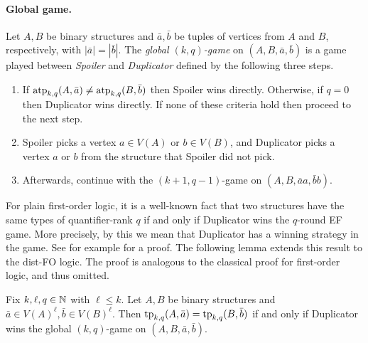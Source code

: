 \paragraph{Global game.}
Let \(A,B\) be binary structures and \(\bar a, \bar b\) be tuples of vertices from \(A\) and \(B\), respectively, with \(|\bar a|=|\bar b|\).
The \emph{global \((k,q)\)-game} on \((A,B,\bar a,\bar b)\) is a game played between \emph{Spoiler} and \emph{Duplicator}
defined by the following three steps.
\begin{enumerate}[label=(\theenumi)]
    \item\label{g:step1}
    If \(\textnormal{atp}_{k,q}(A,\bar a) \neq \textnormal{atp}_{k,q}(B,\bar b)\) then Spoiler wins directly.
    Otherwise, if \(q=0\) then Duplicator wins directly.
    If none of these criteria hold then proceed to the next step.
    \item\label{g:step2} Spoiler picks a vertex \(a \in V(A)\) or \(b \in V(B)\),
and Duplicator picks a vertex \(a\) or \(b\) from the structure that Spoiler did not pick.
    \item\label{g:step3} Afterwards, continue with the \((k+1,q-1)\)-game on \((A,B,\bar a a,\bar b b)\).
\end{enumerate}



For plain first-order logic, it is a well-known fact that
 two structures have the same types of quantifier-rank $q$ if and only if Duplicator wins the \(q\)-round EF game.
 More precisely, by this we mean that Duplicator has a winning strategy in the game.
See for example \cite[Theorem 3.9]{libkin04} for a proof.
The following lemma extends this result to the dist-FO logic.
The proof is analogous to the classical proof for first-order logic, and thus omitted.

\begin{lemma}\label{lem:globaltype}
    Fix $k,\ell,q\in\mathbb N$ with $\ell\le k$.
Let \(A,B\) be binary structures and \(\bar a\in V(A)^\ell, \bar b\in V(B)^\ell\).
Then \(\textnormal{tp}_{k,q}(A,\bar a) = \textnormal{tp}_{k,q}(B,\bar b)\) if and only if Duplicator wins the global \((k,q)\)-game on \((A,B,\bar a,\bar b)\).
\end{lemma}

